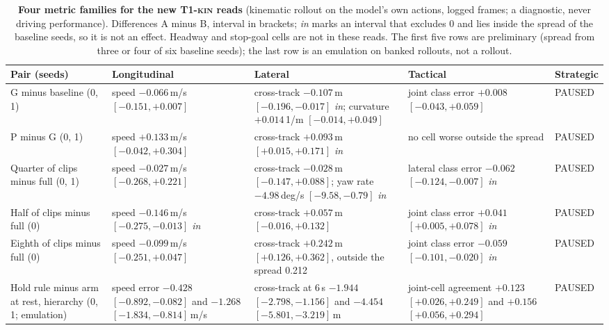 \documentclass[10pt,twocolumn]{article}
\theoremstyle{remark}
\newcommand{\tier}[1]{\textsc{\small #1}}
\begin{document}
\begin{table}[t]
\centering
\caption{\textbf{Four metric families for the new \tier{T1-kin} reads} (kinematic rollout on the model's own actions, logged frames;
a diagnostic, never driving performance). Differences A minus B, interval in brackets; \emph{in} marks an interval
that excludes 0 and lies inside the spread of the baseline seeds, so it is not an effect. Headway and stop-goal cells are not in
these reads. The first five rows are preliminary (spread from three or four of six baseline seeds); the last row is an emulation on banked rollouts, not a rollout.}
\label{tab:fam6}
\small
\begin{tabularx}{\textwidth}{@{}>{\raggedright\arraybackslash}p{31mm}>{\raggedright\arraybackslash}X>{\raggedright\arraybackslash}X>{\raggedright\arraybackslash}X>{\raggedright\arraybackslash}p{19mm}@{}}
\toprule
Pair (seeds) & Longitudinal & Lateral & Tactical & Strategic \\
\midrule
G minus baseline (0, 1) & speed $-0.066$\,m/s $[-0.151,+0.007]$ & cross-track $-0.107$\,m $[-0.196,-0.017]$ \emph{in}; curvature $+0.014$\,1/m $[-0.014,+0.049]$ & joint class error $+0.008$ $[-0.043,+0.059]$ & PAUSED \\
P minus G (0, 1) & speed $+0.133$\,m/s $[-0.042,+0.304]$ & cross-track $+0.093$\,m $[+0.015,+0.171]$ \emph{in} & no cell worse outside the spread & PAUSED \\
Quarter of clips minus full (0, 1) & speed $-0.027$\,m/s $[-0.268,+0.221]$ & cross-track $-0.028$\,m $[-0.147,+0.088]$; yaw rate $-4.98$\,deg/s $[-9.58,-0.79]$ \emph{in} & lateral class error $-0.062$ $[-0.124,-0.007]$ \emph{in} & PAUSED \\
Half of clips minus full (0) & speed $-0.146$\,m/s $[-0.275,-0.013]$ \emph{in} & cross-track $+0.057$\,m $[-0.016,+0.132]$ & joint class error $+0.041$ $[+0.005,+0.078]$ \emph{in} & PAUSED \\
Eighth of clips minus full (0) & speed $-0.099$\,m/s $[-0.251,+0.047]$ & cross-track $+0.242$\,m $[+0.126,+0.362]$, outside the spread 0.212 & joint class error $-0.059$ $[-0.101,-0.020]$ \emph{in} & PAUSED \\
Hold rule minus arm at rest, hierarchy (0, 1; emulation) & speed error $-0.428$ $[-0.892,-0.082]$ and $-1.268$ $[-1.834,-0.814]$\,m/s & cross-track at 6\,s $-1.944$ $[-2.798,-1.156]$ and $-4.454$ $[-5.801,-3.219]$\,m & joint-cell agreement $+0.123$ $[+0.026,+0.249]$ and $+0.156$ $[+0.056,+0.294]$ & PAUSED \\
\bottomrule
\end{tabularx}
\end{table}
\end{document}
